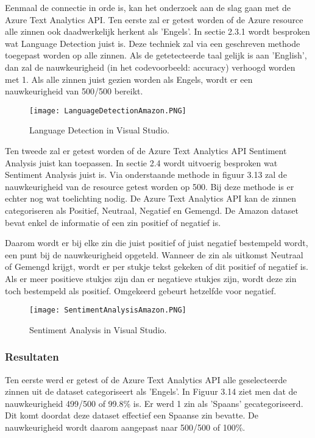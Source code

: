 Eenmaal de connectie in orde is, kan het onderzoek aan de slag gaan met de Azure Text Analytics API. Ten eerste zal er getest worden of de Azure resource alle zinnen ook daadwerkelijk herkent als 'Engels'. In sectie 2.3.1 wordt besproken wat Language Detection juist is. Deze techniek zal via een geschreven methode toegepast worden op alle zinnen. Als de getetecteerde taal gelijk is aan 'English', dan zal de nauwkeurigheid (in het codevoorbeeld: accuracy) verhoogd worden met 1. Als alle zinnen juist gezien worden als Engels, wordt er een nauwkeurigheid van 500/500 bereikt. 

\begin{figure}[!htbp]
    \texttt{[image: LanguageDetectionAmazon.PNG]}
    \caption{\label{azurelanguagedetectionamazon}Language Detection in Visual Studio.}
\end{figure}
\FloatBarrier

Ten tweede zal er getest worden of de Azure Text Analytics API Sentiment Analysis juist kan toepassen. In sectie 2.4 wordt uitvoerig besproken wat Sentiment Analysis juist is. Via onderstaande methode in figuur 3.13 zal de nauwkeurigheid van de resource getest worden op 500. Bij deze methode is er echter nog wat toelichting nodig. De Azure Text Analytics API kan de zinnen categoriseren als Positief, Neutraal, Negatief en Gemengd. De Amazon dataset bevat enkel de informatie of een zin positief of negatief is. 

Daarom wordt er bij elke zin die juist positief of juist negatief bestempeld wordt, een punt bij de nauwkeurigheid opgeteld. Wanneer de zin als uitkomst Neutraal of Gemengd krijgt, wordt er per stukje tekst gekeken of dit positief of negatief is. Als er meer positieve stukjes zijn dan er negatieve stukjes zijn, wordt deze zin toch bestempeld als positief. Omgekeerd gebeurt hetzelfde voor negatief. 

\begin{figure}[!htbp]
    \texttt{[image: SentimentAnalysisAmazon.PNG]}
    \caption{\label{azuresentimentanalysisamazon}Sentiment Analysis in Visual Studio.}
\end{figure}
\FloatBarrier

\subsubsection{Resultaten}
\label{amazondatasetresultatenazure}
Ten eerste werd er getest of de Azure Text Analytics API alle geselecteerde zinnen uit de dataset categoriseert als 'Engels'. In Figuur 3.14 ziet men dat de nauwkeurigheid 499/500 of 99.8\% is. Er werd 1 zin als 'Spaans' gecategoriseerd. Dit komt doordat deze dataset effectief een Spaanse zin bevatte. De nauwkeurigheid wordt daarom aangepast naar 500/500 of 100\%.

